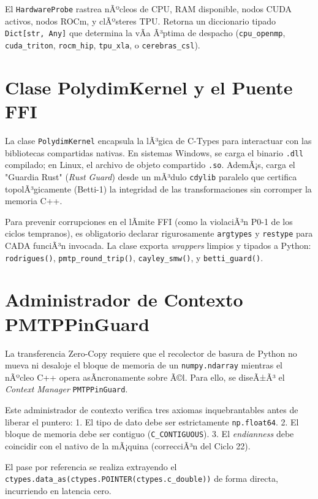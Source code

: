 El \texttt{HardwareProbe} rastrea nÃºcleos de CPU, RAM disponible, nodos CUDA activos, nodos ROCm, y clÃºsteres TPU. Retorna un diccionario tipado \texttt{Dict[str, Any]} que determina la vÃ­a Ã³ptima de despacho (\texttt{cpu\_openmp}, \texttt{cuda\_triton}, \texttt{rocm\_hip}, \texttt{tpu\_xla}, o \texttt{cerebras\_csl}).

\section{Clase PolydimKernel y el Puente FFI}
\label{sec:polydim_kernel_ffi}

La clase \texttt{PolydimKernel} encapsula la lÃ³gica de C-Types para interactuar con las bibliotecas compartidas nativas. 
En sistemas Windows, se carga el binario \texttt{.dll} compilado; en Linux, el archivo de objeto compartido \texttt{.so}. AdemÃ¡s, carga el "Guardia Rust" (\textit{Rust Guard}) desde un mÃ³dulo \texttt{cdylib} paralelo que certifica topolÃ³gicamente (Betti-1) la integridad de las transformaciones sin corromper la memoria C++.

Para prevenir corrupciones en el lÃ­mite FFI (como la violaciÃ³n P0-1 de los ciclos tempranos), es obligatorio declarar rigurosamente \texttt{argtypes} y \texttt{restype} para CADA funciÃ³n invocada. La clase exporta \textit{wrappers} limpios y tipados a Python: \texttt{rodrigues()}, \texttt{pmtp\_round\_trip()}, \texttt{cayley\_smw()}, y \texttt{betti\_guard()}.

\section{Administrador de Contexto PMTPPinGuard}
\label{sec:pmtp_pin_guard}

La transferencia Zero-Copy requiere que el recolector de basura de Python no mueva ni desaloje el bloque de memoria de un \texttt{numpy.ndarray} mientras el nÃºcleo C++ opera asÃ­ncronamente sobre Ã©l. Para ello, se diseÃ±Ã³ el \textit{Context Manager} \texttt{PMTPPinGuard}.

Este administrador de contexto verifica tres axiomas inquebrantables antes de liberar el puntero:
1. El tipo de dato debe ser estrictamente \texttt{np.float64}.
2. El bloque de memoria debe ser contiguo (\texttt{C\_CONTIGUOUS}).
3. El \textit{endianness} debe coincidir con el nativo de la mÃ¡quina (correcciÃ³n del Ciclo 22).

El pase por referencia se realiza extrayendo el \texttt{ctypes.data\_as(ctypes.POINTER(ctypes.c\_double))} de forma directa, incurriendo en latencia cero.

